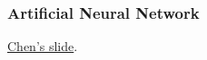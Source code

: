 \begin{frame}[fragile]
    \frametitle{Artificial Neural Network}
    \href{https://marcoylyu.github.io/slides/ANN.html}{Chen's slide}.
\end{frame}